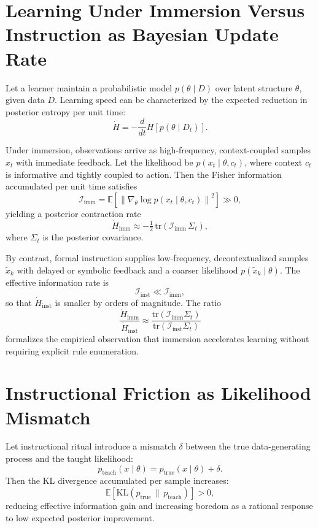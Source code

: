 \documentclass[12pt]{article}
\begin{document}
\section{Learning Under Immersion Versus Instruction as Bayesian Update Rate}

Let a learner maintain a probabilistic model \(p(\theta \mid D)\) over latent structure \(\theta\), given data \(D\). Learning speed can be characterized by the expected reduction in posterior entropy per unit time:
\[
\dot{H} = -\frac{d}{dt} H\!\left[p(\theta \mid D_t)\right].
\]

Under immersion, observations arrive as high-frequency, context-coupled samples \(x_t\) with immediate feedback. Let the likelihood be \(p(x_t \mid \theta, c_t)\), where context \(c_t\) is informative and tightly coupled to action. Then the Fisher information accumulated per unit time satisfies
\[
\mathcal{I}_{\text{imm}} = \mathbb{E}\!\left[ \left\| \nabla_\theta \log p(x_t \mid \theta, c_t) \right\|^2 \right] \gg 0,
\]
yielding a posterior contraction rate
\[
\dot{H}_{\text{imm}} \approx -\tfrac{1}{2}\,\mathrm{tr}\!\left(\mathcal{I}_{\text{imm}}\,\Sigma_t\right),
\]
where \(\Sigma_t\) is the posterior covariance.

By contrast, formal instruction supplies low-frequency, decontextualized samples \(\tilde{x}_k\) with delayed or symbolic feedback and a coarser likelihood \(p(\tilde{x}_k \mid \theta)\). The effective information rate is
\[
\mathcal{I}_{\text{inst}} \ll \mathcal{I}_{\text{imm}},
\]
so that \(\dot{H}_{\text{inst}}\) is smaller by orders of magnitude. The ratio
\[
\frac{\dot{H}_{\text{imm}}}{\dot{H}_{\text{inst}}} \approx 
\frac{\mathrm{tr}(\mathcal{I}_{\text{imm}}\Sigma_t)}{\mathrm{tr}(\mathcal{I}_{\text{inst}}\Sigma_t)}
\]
formalizes the empirical observation that immersion accelerates learning without requiring explicit rule enumeration.

\section{Instructional Friction as Likelihood Mismatch}

Let instructional ritual introduce a mismatch \(\delta\) between the true data-generating process and the taught likelihood:
\[
p_{\text{teach}}(x \mid \theta) = p_{\text{true}}(x \mid \theta) + \delta.
\]
Then the KL divergence accumulated per sample increases:
\[
\mathbb{E}\!\left[\mathrm{KL}\!\left(p_{\text{true}} \,\|\, p_{\text{teach}}\right)\right] > 0,
\]
reducing effective information gain and increasing boredom as a rational response to low expected posterior improvement.
\end{document}
